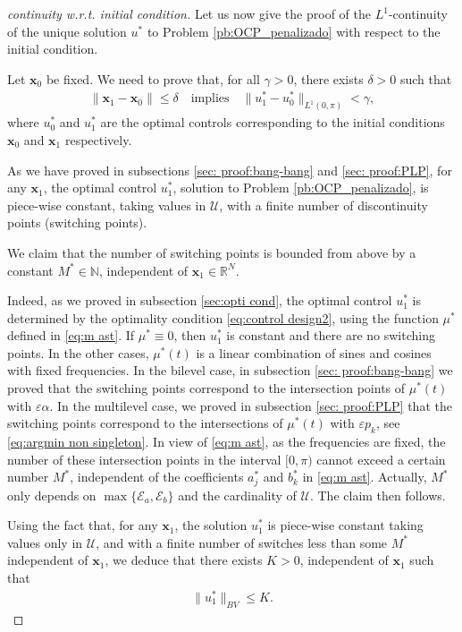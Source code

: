 \documentclass[9pt,shortpaper,twoside,web]{ieeecolor}
\begin{document}
\begin{proof}[continuity w.r.t. initial condition]
	Let us now give the proof of the $L^1$-continuity of the unique solution $u^\ast$ to Problem \ref{pb:OCP_penalizado} with respect to the initial condition. 
	
	Let $\bm{x}_0$ be fixed. We need to prove that, for all $\gamma >0$, there exists $\delta >0$ such that 
	\begin{align*}
		\| \bm{x}_1-\bm{x}_0\| \leq \delta \quad \text{implies} \quad \| u^\ast_1 - u^\ast_0\|_{L^1(0,\pi)} <\gamma,
	\end{align*}
	where $u^\ast_0$ and $u^\ast_1$ are the optimal controls corresponding to the initial conditions $\bm{x}_0$ and $\bm{x}_1$ respectively. 
	
	As we have proved in subsections \ref{sec: proof:bang-bang} and \ref{sec: proof:PLP}, for any $\bm{x}_1$, the optimal control $u_1^\ast$, solution to Problem \ref{pb:OCP_penalizado}, is piece-wise constant, taking values in $\mathcal{U}$, with a finite number of discontinuity points (switching points).
	
	We claim that the number of switching points is bounded from above by a constant $M^\ast \in \mathbb{N}$, independent of  $\bm{x}_1\in \mathbb{R}^N$. 
	
	Indeed, as we proved in subsection \ref{sec:opti cond}, the optimal control $u_1^\ast$ is determined by the optimality condition \eqref{eq:control design2}, using the function $\mu^\ast$ defined in \eqref{eq:m ast}. If $\mu^\ast \equiv 0$, then $u^\ast_1$ is constant and there are no switching points. In the other cases, $\mu^\ast(t)$ is a linear combination of sines and cosines with fixed frequencies.  In the bilevel case, in subsection \ref{sec: proof:bang-bang} we proved that the switching points correspond to the intersection points of $\mu^\ast(t)$ with $\varepsilon\alpha$. In the multilevel case, we proved in subsection \ref{sec: proof:PLP} that the switching points correspond to the intersections of $\mu^\ast(t)$ with $\varepsilon p_k$, see \eqref{eq:argmin non singleton}. In view of \eqref{eq:m ast}, as the frequencies are fixed, the number of these intersection points in the interval $[0,\pi)$ cannot exceed a certain number $M^\ast$, independent of the coefficients $a_j^\ast$ and $b_k^\ast$ in \eqref{eq:m ast}. Actually, $M^\ast$ only depends on  $\max\{\mathcal{E}_a, \mathcal{E}_b\}$ and the cardinality of $\mathcal U$. The claim then follows.
	
	Using the fact that, for any $\bm{x}_1$, the solution $u_1^\ast$ is piece-wise constant taking values only in $\mathcal{U}$, and with a finite number of switches less than some $M^\ast$ independent of $\bm{x}_1$,  we deduce that there exists $K>0$, independent of $\bm{x}_1$ such that
	\begin{align*}
		\| u_1^\ast\|_{BV} \leq K.
	\end{align*}
	

\end{proof}
\end{document}
